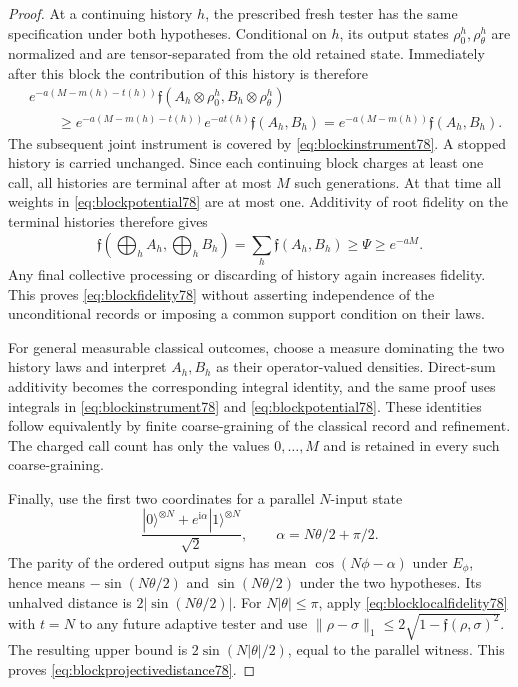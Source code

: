 \begin{proof}
At a continuing history $h$, the prescribed fresh tester has the
same specification under both hypotheses.  Conditional on $h$,
its output states $\rho_0^h,\rho_\theta^h$ are normalized and are
tensor-separated from the old retained state.  Immediately after
this block the contribution of this history is therefore
\[
 \begin{split}
 &e^{-a(M-m(h)-t(h))}
   \mathfrak f(A_h\otimes\rho_0^h,
               B_h\otimes\rho_\theta^h)\\
 &\qquad\ge
 e^{-a(M-m(h)-t(h))}e^{-at(h)}\mathfrak f(A_h,B_h)
 =e^{-a(M-m(h))}\mathfrak f(A_h,B_h).
 \end{split}
\]
The subsequent joint instrument is covered by
\eqref{eq:blockinstrument78}.  A stopped history is carried
unchanged.  Since each continuing block charges at least one call,
all histories are terminal after at most $M$ such generations.
At that time all weights in \eqref{eq:blockpotential78} are at
most one.  Additivity of root fidelity on the terminal histories
therefore gives
\[
 \mathfrak f\!\left(\bigoplus_h A_h,\bigoplus_h B_h\right)
 =\sum_h\mathfrak f(A_h,B_h)\ge\Psi\ge e^{-aM}.
\]
Any final collective processing or discarding of history again
increases fidelity.  This proves \eqref{eq:blockfidelity78} without
asserting independence of the unconditional records or imposing a
common support condition on their laws.

For general measurable classical outcomes, choose a measure dominating
the two history laws and interpret $A_h,B_h$ as their operator-valued
densities.  Direct-sum additivity becomes the corresponding integral
identity, and the same proof uses integrals in
\eqref{eq:blockinstrument78} and \eqref{eq:blockpotential78}.
These identities follow equivalently by finite coarse-graining of
the classical record and refinement.  The charged call count has
only the values $0,\ldots,M$ and is retained in every such
coarse-graining.

Finally, use the first two coordinates for a parallel $N$-input state
\[
 \frac{|0\rangle^{\otimes N}
             +e^{\mathrm i\alpha}|1\rangle^{\otimes N}}{\sqrt2},
 \qquad \alpha=N\theta/2+\pi/2.
\]
The parity of the ordered output signs has mean
$\cos(N\phi-\alpha)$ under $E_\phi$, hence means
$-\sin(N\theta/2)$ and $\sin(N\theta/2)$ under the two
hypotheses.  Its unhalved distance is $2|\sin(N\theta/2)|$.
For $N|\theta|\le\pi$, apply
\eqref{eq:blocklocalfidelity78} with $t=N$ to any future adaptive
tester and use
$\|\rho-\sigma\|_1\le2\sqrt{1-\mathfrak f(\rho,\sigma)^2}$.
The resulting upper bound is $2\sin(N|\theta|/2)$, equal to the
parallel witness.  This proves \eqref{eq:blockprojectivedistance78}.
\end{proof}

